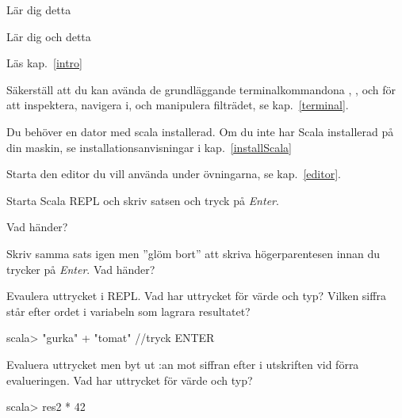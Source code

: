 



\begin{Goals}
\item Lär dig detta
\item Lär dig och detta
\end{Goals}

\begin{Preparations}
\item Läs kap.~\ref{intro}
\item Säkerställ att du kan avända de grundläggande terminalkommandona , ,  och  för att inspektera, navigera i, och manipulera filträdet, se kap.~\ref{terminal}. 
\item Du behöver en dator med scala installerad. Om du inte har Scala installerad på din maskin, se installationsanvisningar i kap.~\ref{installScala}
\item Starta den editor du vill använda under övningarna, se kap.~\ref{editor}.
\end{Preparations}

\BasicTasks


\Task Starta Scala REPL och skriv satsen  och tryck på \textit{Enter}. 


\Subtask Vad händer? 

\Subtask Skriv samma sats igen men ''glöm bort'' att skriva högerparentesen innan du trycker på \textit{Enter}. Vad händer?

\Subtask Evaulera uttrycket  i REPL. Vad har uttrycket för värde och typ? Vilken siffra står efter ordet  i variabeln som lagrara resultatet?

\begin{REPL}
scala> "gurka" + "tomat"   //tryck ENTER
\end{REPL}

\Subtask Evaluera uttrycket  men byt ut :an mot siffran efter  i utskriften vid förra evalueringen. Vad har uttrycket för värde och typ?
\begin{REPL}
scala> res2 * 42
\end{REPL}

